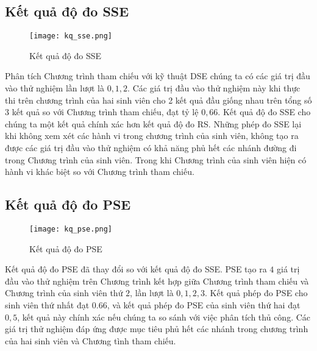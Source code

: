 \subsection{Kết quả độ đo SSE}

\begin{center}
  \begin{figure}[H]
    \begin{center}
      \texttt{[image: kq\_sse.png]}
    \end{center}
    \caption{Kết quả độ đo SSE}
  \end{figure}
\end{center}

Phân tích Chương trình tham chiếu với kỹ thuật DSE chúng ta có các giá
trị đầu vào thử nghiệm lần lượt là $0, 1, 2$. Các giá trị đầu vào thử
nghiệm này khi thực thi trên chương trình của hai sinh viên cho 2 kết
quả đầu giống nhau trên tổng số 3 kết quả so với Chương trình tham
chiếu, đạt tỷ lệ $0,66$. Kết quả độ đo SSE cho chúng ta một kết quả
chính xác hơn kết quả độ đo RS. Những phép đo SSE lại khi không xem
xét các hành vi trong chương trình của sinh viên, không tạo ra được
các giá trị đầu vào thử nghiệm có khả năng phủ hết các nhánh đường đi trong
Chương trình của sinh viên. Trong khi Chương trình của sinh viên hiện
có hành vi khác biệt so với Chương trình tham chiếu.

\subsection{Kết quả độ đo PSE}
\begin{center}
	\begin{figure}[H]
		\begin{center}
			\texttt{[image: kq\_pse.png]}
		\end{center}
		\caption{Kết quả độ đo PSE}		
	\end{figure}
\end{center}

Kết quả độ đo PSE đã thay đổi so với kết quả độ đo SSE. PSE tạo ra $4$
giá trị đầu vào thử nghiệm trên Chương trình kết hợp giữa Chương trình
tham chiếu và Chương trình của sinh viên thứ $2$, lần lượt là
$0, 1, 2, 3$. Kết quả phép đo PSE cho sinh viên thứ nhất đạt $0.66$,
và kết quả phép đo PSE của sinh viên thứ hai đạt $0,5$, kết quả này
chính xác nếu chúng ta so sánh với việc phân tích thủ công. Các giá
trị thử nghiệm đáp ứng được mục tiêu phủ hết các nhánh trong chương
trình của hai sinh viên và Chương tình tham chiếu.

